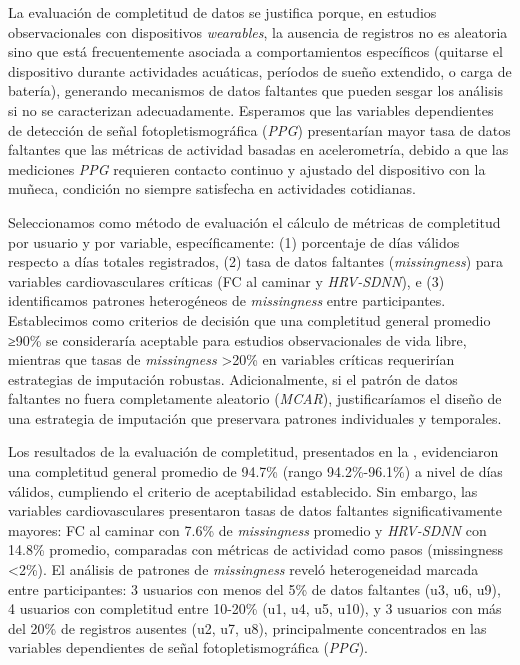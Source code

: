 La evaluación de completitud de datos se justifica porque, en estudios observacionales con dispositivos \textit{wearables}, la ausencia de registros no es aleatoria sino que está frecuentemente asociada a comportamientos específicos (quitarse el dispositivo durante actividades acuáticas, períodos de sueño extendido, o carga de batería), generando mecanismos de datos faltantes que pueden sesgar los análisis si no se caracterizan adecuadamente. Esperamos que las variables dependientes de detección de señal fotopletismográfica (\textit{PPG}) presentarían mayor tasa de datos faltantes que las métricas de actividad basadas en acelerometría, debido a que las mediciones \textit{PPG} requieren contacto continuo y ajustado del dispositivo con la muñeca, condición no siempre satisfecha en actividades cotidianas.

Seleccionamos como método de evaluación el cálculo de métricas de completitud por usuario y por variable, específicamente: (1) porcentaje de días válidos respecto a días totales registrados, (2) tasa de datos faltantes (\textit{missingness}) para variables cardiovasculares críticas (FC al caminar y \textit{HRV-SDNN}), e (3) identificamos patrones heterogéneos de \textit{missingness} entre participantes. Establecimos como criterios de decisión que una completitud general promedio ≥90\% se consideraría aceptable para estudios observacionales de vida libre, mientras que tasas de \textit{missingness} >20\% en variables críticas requerirían estrategias de imputación robustas. Adicionalmente, si el patrón de datos faltantes no fuera completamente aleatorio (\textit{MCAR}), justificaríamos el diseño de una estrategia de imputación que preservara patrones individuales y temporales.

Los resultados de la evaluación de completitud, presentados en la , evidenciaron una completitud general promedio de 94.7\% (rango 94.2\%-96.1\%) a nivel de días válidos, cumpliendo el criterio de aceptabilidad establecido. Sin embargo, las variables cardiovasculares presentaron tasas de datos faltantes significativamente mayores: FC al caminar con 7.6\% de \textit{missingness} promedio y \textit{HRV-SDNN} con 14.8\% promedio, comparadas con métricas de actividad como pasos (missingness <2\%). El análisis de patrones de \textit{missingness} reveló heterogeneidad marcada entre participantes: 3 usuarios con menos del 5\% de datos faltantes (u3, u6, u9), 4 usuarios con completitud entre 10-20\% (u1, u4, u5, u10), y 3 usuarios con más del 20\% de registros ausentes (u2, u7, u8), principalmente concentrados en las variables dependientes de señal fotopletismográfica (\textit{PPG}).

